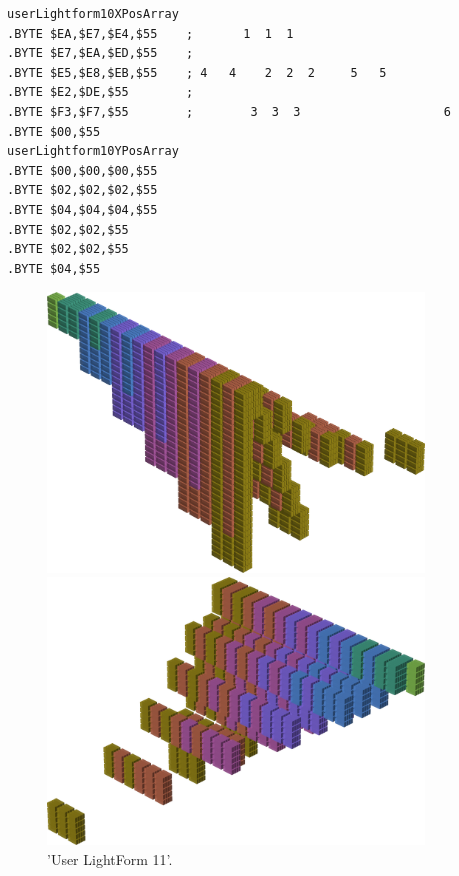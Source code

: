 \begin{minipage}[b]{0.58\linewidth}
\vspace{2cm}
\begin{lrbox}{\mybox}%
\hspace{1cm}
\begin{lstlisting}[basicstyle=\ttfamily\tiny,escapechar=\%]
userLightform10XPosArray
.BYTE $EA,$E7,$E4,$55    ;       1  1  1                      
.BYTE $E7,$EA,$ED,$55    ;                                    
.BYTE $E5,$E8,$EB,$55    ; 4   4    2  2  2     5   5         
.BYTE $E2,$DE,$55        ;                                    
.BYTE $F3,$F7,$55        ;        3  3  3                    6
.BYTE $00,$55
userLightform10YPosArray
.BYTE $00,$00,$00,$55
.BYTE $02,$02,$02,$55
.BYTE $04,$04,$04,$55
.BYTE $02,$02,$55
.BYTE $02,$02,$55
.BYTE $04,$55
\end{lstlisting}
\end{lrbox}%
\scalebox{0.8}{\usebox{\mybox}}

\end{minipage}
%
%
\begin{minipage}[b]{0.48\linewidth}
\begin{figure}[H]
    \centering
    \begin{adjustbox}{width=5cm,margin=0cm 0cm}
      \includegraphics[width=10cm]{src/colorspace_patterns/pattern19-45.png}%
    \end{adjustbox}
    \begin{adjustbox}{width=5cm,margin=0cm 0cm}
      \includegraphics[width=10cm]{src/colorspace_patterns/pattern19-225.png}%
    \end{adjustbox}
\caption{'User LightForm 11'.}
\end{figure}
\end{minipage}
